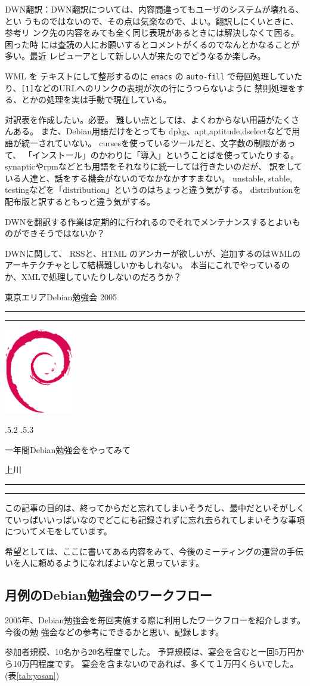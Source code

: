 \documentclass[mingoth,a4paper]{jsarticle}
\makeatletter
\renewcommand{\section}{\@startsection{section}{1}{\z@}%
    {\Cvs \@plus.5\Cdp \@minus.2\Cdp}%
    {.5\Cvs \@plus.3\Cdp}%
    {\normalfont\Large\headfont\raggedright\centering}} %
\newcommand{\dancersection}[2]{%
\newpage
東京エリアDebian勉強会 2005
\hrule
\vspace{0.5mm}
\hrule
\hfill{}\includegraphics[width=3cm]{image200502/openlogo-nd.eps}\\
\vspace{-4cm}
\begin{center}
  \section{#1}
\end{center}
\hfill{}#2\hspace{3cm}\space\\
\hrule
\hrule
\vspace{1cm}
}
\newcommand{\tbref}[1]{表\ref{#1}}
\makeatother
\begin{document}
DWN翻訳：DWN翻訳については、内容間違ってもユーザのシステムが壊れる、とい
うものではないので、その点は気楽なので、よい。翻訳しにくいときに、参考リ
ンク先の内容をみても全く同じ表現があるときには解決しなくて困る。困った時
には査読の人にお願いするとコメントがくるのでなんとかなることが多い。最近
レビューアとして新しい人が来たのでどうなるか楽しみ。

WML を テキストにして整形するのに \texttt{emacs} の \texttt{auto-fill} 
で毎回処理していたり、\verb![1]!などのURLへのリンクの表現が次の行にうつらないように
禁則処理をする、とかの処理を実は手動で現在している。

対訳表を作成したい。必要。
難しい点としては、よくわからない用語がたくさんある。
また、Debian用語だけをとっても
dpkg、apt,aptitude,dselectなどで用語が統一されていない。
cursesを使っているツールだと、文字数の制限があって、
「インストール」のかわりに「導入」ということばを使っていたりする。
synapticやrpmなどとも用語をそれなりに統一しては行きたいのだが、
訳をしている人達と、話をする機会がないのでなかなかすすまない。
unstable, stable, testingなどを「distribution」というのはちょっと違う気がする。
distributionを配布版と訳するともっと違う気がする。

DWNを翻訳する作業は定期的に行われるのでそれでメンテナンスするとよいものができそうではないか？

DWNに関して、
RSSと、HTML のアンカーが欲しいが、追加するのはWMLのアーキテクチャとして結構難しいかもしれない。
本当にこれでやっているのか、XMLで処理していたりしないのだろうか？

\dancersection{一年間Debian勉強会をやってみて}{上川}
\label{sec:uekawa}

この記事の目的は、終ってからだと忘れてしまいそうだし、最中だといそがしく
ていっぱいいっぱいなのでどこにも記録されずに忘れ去られてしまいそうな事項
についてメモをしています。

希望としては、ここに書いてある内容をみて、今後のミーティングの運営の手伝
いを人に頼めるようになればよいなと思っています。

\subsection{月例のDebian勉強会のワークフロー}

2005年、Debian勉強会を毎回実施する際に利用したワークフローを紹介します。今後の勉
強会などの参考にできるかと思い、記録します。

参加者規模、10名から20名程度でした。
予算規模は、宴会を含むと一回5万円から10万円程度です。
宴会を含まないのであれば、多くて１万円くらいでした。(\tbref{tab:yosan})
\end{document}

